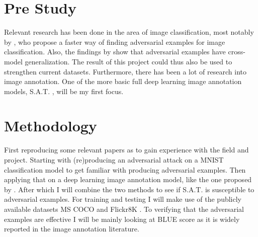 \documentclass[12pt]{extarticle}
\begin{document}

\section{Pre Study}
Relevant research has been done in the area of image classification, most notably by \citeauthor{goodfellow2015explaining}, who propose a faster way of finding adversarial examples for image classification. Also, the findings by \citeauthor{venkatesh} show that adversarial examples have cross-model generalization. The result of this project could thus also be used to strengthen current datasets. Furthermore, there has been a lot of research into image annotation. One of the more basic full deep learning image annotation models, S.A.T. \cite{xu2016show}, will be my first focus.

\section{Methodology}
First reproducing some relevant papers as to gain experience with the field and project. Starting with (re)producing an adversarial attack on a MNIST classification model \cite{szegedy2014intriguing} to get familiar with producing adversarial examples. Then applying that on a deep learning image annotation model, like the one proposed by \citeauthor{xu2016show}. After which I will combine the two methods to see if S.A.T. is susceptible to adversarial examples. For training and testing I will make use of the publicly available datasets MS COCO \cite{lin2015microsoft} and Flickr8K \cite{Flickr8k}. To verifying that the adversarial examples are effective I will be mainly looking at BLUE \cite{papineni_roukos_ward_zhu_2001} score as it is widely reported in the image annotation literature.
\end{document}
